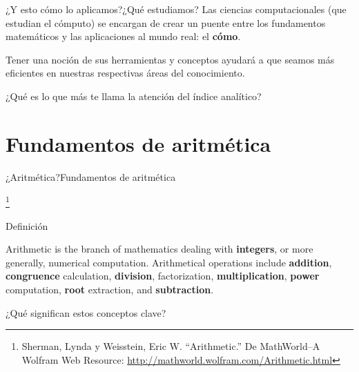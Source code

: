 \documentclass[spanish]{beamer}
\newcommand\blfootnote[1]{%
\begingroup
\renewcommand\thefootnote{}\footnote{#1}%
\addtocounter{footnote}{-1}%
\endgroup
}
\begin{document}
\begin{frame}{¿Y esto cómo lo aplicamos?}{¿Qué estudiamos?}
    Las \alert{ciencias computacionales} (que estudian el cómputo) se encargan de crear un puente entre los fundamentos matemáticos y las aplicaciones al mundo real: el \textbf{cómo}. \pause

    \bigskip

    Tener una noción de sus herramientas y conceptos ayudará a que seamos más eficientes en nuestras respectivas áreas del conocimiento. \pause

    \bigskip

    \begin{center}
        \Large
        ¿Qué es lo que más te llama la atención del índice analítico?
    \end{center}
\end{frame}

\section{Fundamentos de aritmética}

\begin{frame}{¿Aritmética?}{Fundamentos de aritmética}
    
    \blfootnote{Sherman, Lynda y Weisstein, Eric W. ``Arithmetic.'' De MathWorld--A Wolfram Web Resource: \url{http://mathworld.wolfram.com/Arithmetic.html}}

    \begin{block}{Definición}
        \begin{displayquote}
            Arithmetic is the branch of mathematics dealing with \textbf<2->{integers}, or more generally, \alert<2->{numerical computation}.
            Arithmetical operations include \textbf<2->{addition}, \textbf<2->{congruence} calculation, \textbf<2->{division}, factorization, \textbf<2->{multiplication}, \textbf<2->{power} computation, \textbf<2->{root} extraction, and \textbf<2->{subtraction}.
        \end{displayquote}
    \end{block} \pause
    
    \bigskip

    \begin{center}
        \Large
        ¿Qué significan estos conceptos clave?
    \end{center}
\end{frame}
\end{document}
